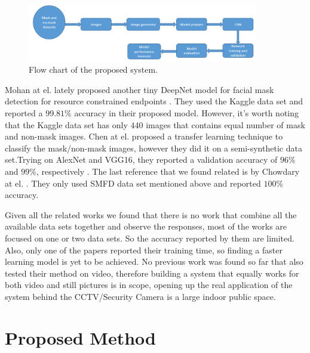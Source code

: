 \documentclass{svproc}
\begin{document}
\begin{figure}[!ht]
\includegraphics[width=0.9\textwidth]{flowChart.png}
\centering
\caption{Flow chart of the proposed system.}
\label{flowChart}
\end{figure}

\par Mohan at el. lately proposed another tiny DeepNet model for facial mask detection for resource constrained endpoints \cite{mohan2020tiny}. They used the Kaggle data set and reported a $99.81\%$ accuracy in their proposed model. However, it's worth noting that the Kaggle data set has only $440$ images that contains equal number of mask and non-mask images. Chen at el. proposed a transfer learning technique to classify the mask/non-mask images, however they did it on a semi-synthetic data set.Trying on AlexNet and VGG16, they reported a validation accuracy of $ 96\%$ and $99\%$, respectively \cite{chen2020efficient}. The last reference that we found related is by Chowdary at el. \cite{chowdary2020face}. They only used SMFD data set mentioned above and reported $100\%$ accuracy. \\

\par Given all the  related works we found that there is no work that combine all the available data sets together and observe the responses, most of the works are focused on one or two data sets. So the accuracy reported by them are limited. Also, only one of the papers reported their training time, so finding a faster learning model is yet to be achieved. No previous work was found so far that also tested their method on video, therefore building a system that equally works for both video and still pictures is in scope, opening up the real application of the system behind the CCTV/Security Camera is a large indoor public space. 

\section{Proposed Method}
\end{document}
